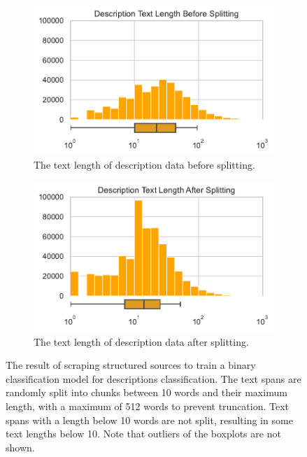 \documentclass[a4paper, 12pt, oneside]{book} %
\begin{document}
\begin{figure} [htpb]
\begin{subfigure}[b]{0.49\textwidth}
         \includegraphics[width=\textwidth]{histogram_text_length_2.pdf}
         \caption{The text length of description data before splitting.}
         \label{fig:text_length_2}
     \end{subfigure}
     \hfill
     \begin{subfigure}[b]{0.49\textwidth}
         \centering
         \includegraphics[width=\textwidth]{histogram_text_length_4.pdf}
         \caption{The text length of description data after splitting.}
         \label{fig:text_length_4}
     \end{subfigure}
    \caption[Text length distribution for training web crawler model]{The result of scraping structured sources to train  a binary classification model for descriptions classification. The text spans are randomly split into chunks between 10 words and their maximum length, with a maximum of 512 words to prevent truncation. Text spans with a length below 10 words are not split, resulting in some text lengths below 10. Note that outliers of the boxplots are not shown.}
    \label{fig:text_length_distribution}
\end{figure}
\end{document}
